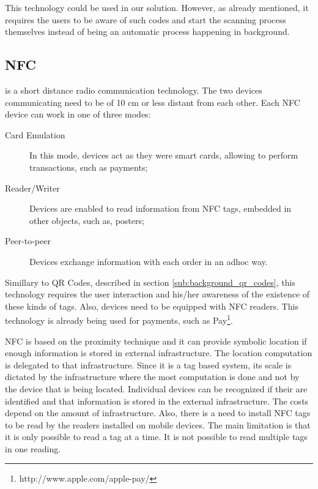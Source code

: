 This technology could be used in our solution.
However, as already mentioned, it requires the users to be aware of such codes and start the scanning process themselves instead of being an automatic process happening in background.

\subsection{NFC}
\label{sub:background_near_field _communication}
 is a short distance radio communication technology.
The two devices communicating need to be of 10 cm or less distant from each other.
Each \gls{NFC} device can work in one of three modes:
\begin{description}
  \item[Card Emulation] In this mode, devices act as they were smart cards, allowing to perform transactions, such as payments;
  \item[Reader/Writer] Devices are enabled to read information from \gls{NFC} tags, embedded in other objects, such as, posters;
  \item[Peer-to-peer] Devices exchange information with each order in an adhoc way.
\end{description}

Simillary to \gls{QR} Codes, described in section \ref{sub:background_qr_codes}, this technology requires the user interaction and his/her awareness of the existence of these kinds of tags.
Also, devices need to be equipped with \gls{NFC} readers.
This technology is already being used for payments, such as  Pay\footnote{http://www.apple.com/apple-pay/}.

\gls{NFC} is based on the proximity technique and it can provide symbolic location if enough information is stored in external infrastructure.
The location computation is delegated to that infrastructure.
Since it is a tag based system, its scale is dictated by the infrastructure where the most computation is done and not by the device that is being located.
Individual devices can be recognized if their are identified and that information is stored in the external infrastructure.
The costs depend on the amount of infrastructure. Also, there is a need to install \gls{NFC} tags to be read by the readers installed on mobile devices.
The main limitation is that it is only possible to read a tag at a time. It is not possible to read multiple tags in one reading.

